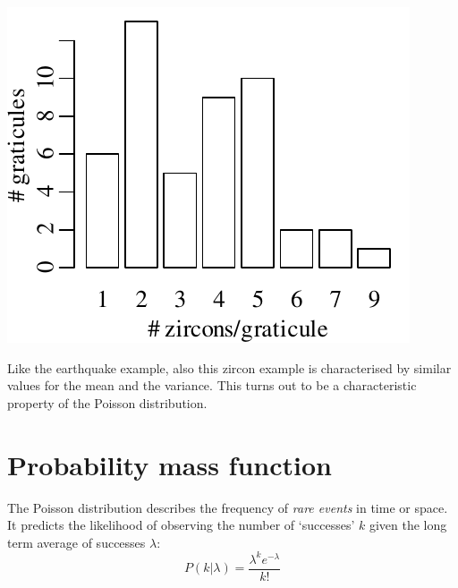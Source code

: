 \noindent\begin{minipage}[t][][b]{.3\textwidth}
  \includegraphics[width=\textwidth]{../figures/zirconhist.pdf}\medskip
\end{minipage}
\begin{minipage}[t][][t]{.7\textwidth}
  \label{fig:zirconhist}
\end{minipage}

Like the earthquake example, also this zircon example is characterised
by similar values for the mean and the variance. This turns out to be
a characteristic property of the Poisson distribution.

\section{Probability mass function}
\label{sec:PMF}

The Poisson distribution describes the frequency of \textit{rare
  events} in time or space.  It predicts the likelihood of observing
the number of `successes' $k$ given the long term average of successes
$\lambda$:
\begin{equation}
  P(k|\lambda) = \frac{\lambda^k e^{-\lambda}}{k!}
  \label{eq:poispmf}
\end{equation}

